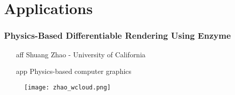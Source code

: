 \documentclass[11pt]{beamer}
\begin{document}
\section{Applications}

\begin{frame}
	\frametitle{Physics-Based Differentiable Rendering Using Enzyme}

	\begin{minipage}{0.53\linewidth}
		\begin{itemize}
			\item[aff] Shuang Zhao - University of California
			\item[app] Physics-based computer graphics
		\end{itemize}
	\end{minipage}
	\hfill
	\begin{minipage}{0.40\linewidth}
		\begin{figure}
			\texttt{[image: zhao\_wcloud.png]}
		\end{figure}
	\end{minipage}
\end{frame}
\end{document}
